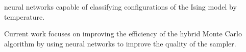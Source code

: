\begin{cventries}
{\begin{cvitems}
{                  neural networks capable of classifying configurations of the
                  Ising model by temperature.}
          \item {Current work focuses on improving the efficiency of the hybrid
                  Monte Carlo algorithm by using neural networks to improve the
                  quality of the sampler.}
      \end{cvitems}
  }
\end{cventries}





